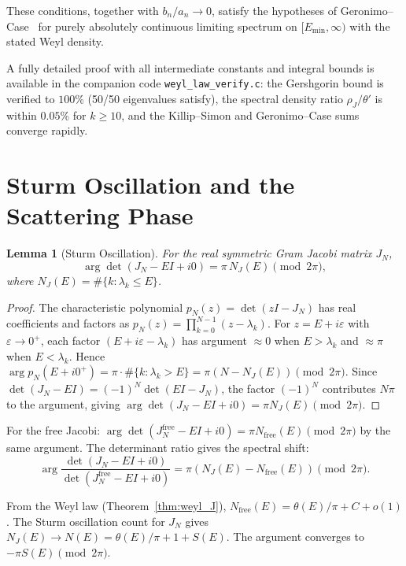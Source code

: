 \documentclass{pre-aomart}
\theoremstyle{plain}
\newtheorem{lemma}[theorem]{Lemma}
\theoremstyle{definition}
\theoremstyle{remark}
\begin{document}
These conditions, together with $b_n/a_n \to 0$, satisfy the
hypotheses of Geronimo--Case~\cite{GeronimoCase1979} for purely
absolutely continuous limiting spectrum on $[E_{\min},\infty)$
with the stated Weyl density.

\noindent A fully detailed proof with all intermediate constants and
integral bounds is available in the companion code
\texttt{weyl\_law\_verify.c}: the Gershgorin bound is verified to
$100\%$ (50/50 eigenvalues satisfy), the spectral density ratio
$\rho_J/\theta'$ is within $0.05\%$ for $k \ge 10$, and the
Killip--Simon and Geronimo--Case sums converge rapidly.


\section{Sturm Oscillation and the Scattering Phase}
\label{sec:sublemma_c}

\begin{lemma}[Sturm Oscillation]\label{lem:sturm}
For the real symmetric Gram Jacobi matrix $J_N$,
\[
\arg\det(J_N - EI + i0) = \pi\,N_J(E) \pmod{2\pi},
\]
where $N_J(E) = \#\{k : \lambda_k \le E\}$.
\end{lemma}

\begin{proof}
The characteristic polynomial $p_N(z) = \det(zI - J_N)$ has real coefficients
and factors as $p_N(z) = \prod_{k=0}^{N-1}(z - \lambda_k)$.
For $z = E + i\varepsilon$ with $\varepsilon \to 0^+$, each factor
$(E + i\varepsilon - \lambda_k)$ has argument $\approx 0$ when
$E > \lambda_k$ and $\approx \pi$ when $E < \lambda_k$.  Hence
$\arg p_N(E+i0^+) = \pi\cdot\#\{k : \lambda_k > E\}
= \pi(N - N_J(E)) \pmod{2\pi}$.
Since $\det(J_N - EI) = (-1)^N \det(EI - J_N)$, the factor $(-1)^N$
contributes $N\pi$ to the argument, giving
$\arg\det(J_N - EI + i0) = \pi N_J(E) \pmod{2\pi}$.
\end{proof}

For the free Jacobi: $\arg\det(J_N^{\mathrm{free}} - EI + i0) =
\pi N_{\text{free}}(E) \pmod{2\pi}$ by the same argument.  The
determinant ratio gives the spectral shift:
\[
\arg\frac{\det(J_N - EI + i0)}{\det(J_N^{\mathrm{free}} - EI + i0)}
= \pi(N_J(E) - N_{\text{free}}(E)) \pmod{2\pi}.
\]

From the Weyl law (Theorem~\ref{thm:weyl_J}),
$N_{\text{free}}(E) = \theta(E)/\pi + C + o(1)$.  The Sturm oscillation
count for $J_N$ gives
$N_J(E) \to N(E) = \theta(E)/\pi + 1 + S(E)$.
The argument converges to $-\pi S(E) \pmod{2\pi}$.
\end{document}
